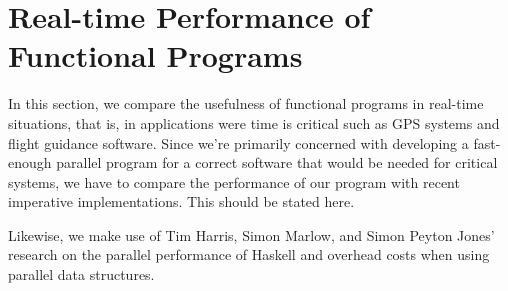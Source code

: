 \section{Real-time Performance of Functional Programs}
In this section, we compare the usefulness of functional programs in real-time situations, that is, in 
applications were time is critical such as GPS systems and flight guidance software.\cite{Frame2014}
Since we're primarily concerned with developing a fast-enough parallel program for a correct software that 
would be needed for critical systems, we have to compare the performance of our program with recent imperative 
implementations. This should be stated here.

Likewise, we make use of Tim Harris, Simon Marlow, and Simon Peyton Jones' research on the parallel 
performance of Haskell and overhead costs when using parallel data structures.\cite{Harris2005}







